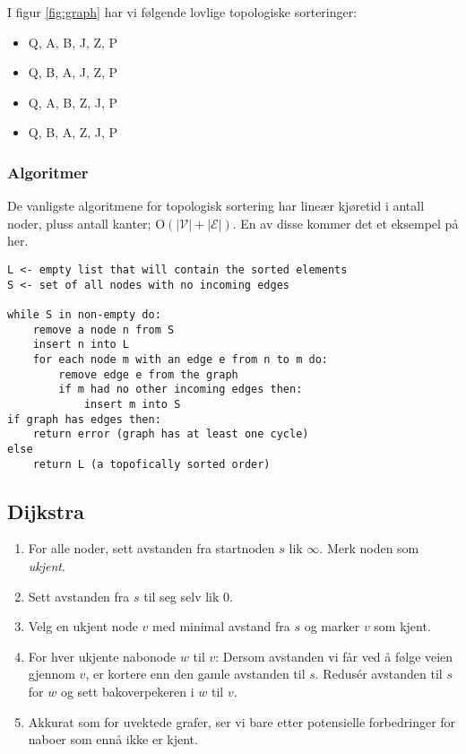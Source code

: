 \documentclass[11pt,a4paper]{article}
\theoremstyle{def}
\begin{document}
I figur \ref{fig:graph} har vi følgende lovlige topologiske sorteringer:

\begin{itemize}
\item
Q, A, B, J, Z, P
\item
Q, B, A, J, Z, P
\item
Q, A, B, Z, J, P
\item
Q, B, A, Z, J, P
\end{itemize}

\subsubsection{Algoritmer} De vanligste algoritmene for topologisk sortering har lineær kjøretid i antall noder, pluss antall kanter; O$(|\mathcal{V}|+|\mathcal{E}|)$. En av disse kommer det et eksempel på her.

\begin{Verbatim}[frame=single]
L <- empty list that will contain the sorted elements
S <- set of all nodes with no incoming edges

while S in non-empty do:
    remove a node n from S
    insert n into L
    for each node m with an edge e from n to m do:
        remove edge e from the graph
        if m had no other incoming edges then:
            insert m into S
if graph has edges then:
    return error (graph has at least one cycle)
else
    return L (a topofically sorted order)
\end{Verbatim}

\subsection{Dijkstra}
\begin{enumerate}
\item
For alle noder, sett avstanden fra startnoden $s$ lik $\infty$. Merk noden som \textit{ukjent}.
\item
Sett avstanden fra $s$ til seg selv lik 0.
\item
Velg en ukjent node $v$ med minimal avstand fra $s$ og marker $v$ som kjent.
\item
For hver ukjente nabonode $w$ til $v$: Dersom avstanden vi får ved å følge veien gjennom $v$, er kortere enn den gamle avstanden til $s$. Redusér avstanden til $s$ for $w$ og sett bakoverpekeren i $w$ til $v$.
\item
Akkurat som for uvektede grafer, ser vi bare etter potensielle forbedringer for naboer som ennå ikke er kjent.
\end{enumerate}
\end{document}
